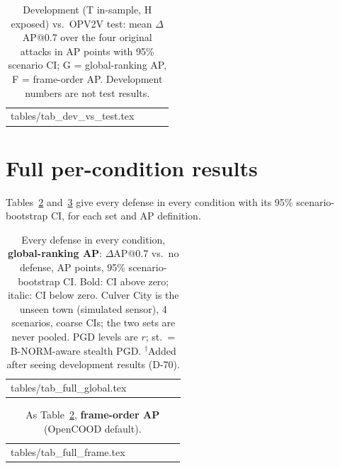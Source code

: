 \documentclass[conference]{IEEEtran}
\makeatletter
\newcommand{\tabin}[1]{\@@input #1 }
\makeatother
\begin{document}
\begin{table}[!t]
\caption{Development (T in-sample, H exposed) vs.\ OPV2V test: mean $\Delta$AP@0.7 over the four original
attacks in AP points with 95\% scenario CI; G = global-ranking AP, F = frame-order AP. Development numbers are not
test results.}
\label{tab:devtest}
\centering
\scriptsize
\setlength{\tabcolsep}{2.2pt}
\begin{tabular}{@{}lccc@{}}
\toprule
\tabin{tables/tab_dev_vs_test.tex}
\bottomrule
\end{tabular}
\end{table}

\section{Full per-condition results}
\label{app:full}
Tables~\ref{tab:full-g} and~\ref{tab:full-f} give every defense in every condition with its 95\%
scenario-bootstrap CI, for each set and AP definition.

\begin{table}[!t]
\caption{Every defense in every condition, \textbf{global-ranking AP}: $\Delta$AP@0.7 vs.\ no defense, AP points,
95\% scenario-bootstrap CI. Bold: CI above zero; italic: CI below zero. Culver City is the unseen town (simulated
sensor), 4 scenarios, coarse CIs; the two sets are never pooled. PGD levels are $r$; st.\ = B-NORM-aware stealth
PGD. $^\dagger$Added after seeing development results (D-70).}
\label{tab:full-g}
\centering
\scriptsize
\setlength{\tabcolsep}{3pt}
\begin{tabular}{@{}lccccc@{}}
\toprule
\tabin{tables/tab_full_global.tex}
\bottomrule
\end{tabular}
\end{table}

\begin{table}[!t]
\caption{As Table~\ref{tab:full-g}, \textbf{frame-order AP} (OpenCOOD default).}
\label{tab:full-f}
\centering
\scriptsize
\setlength{\tabcolsep}{3pt}
\begin{tabular}{@{}lccccc@{}}
\toprule
\tabin{tables/tab_full_frame.tex}
\bottomrule
\end{tabular}
\end{table}
\end{document}
